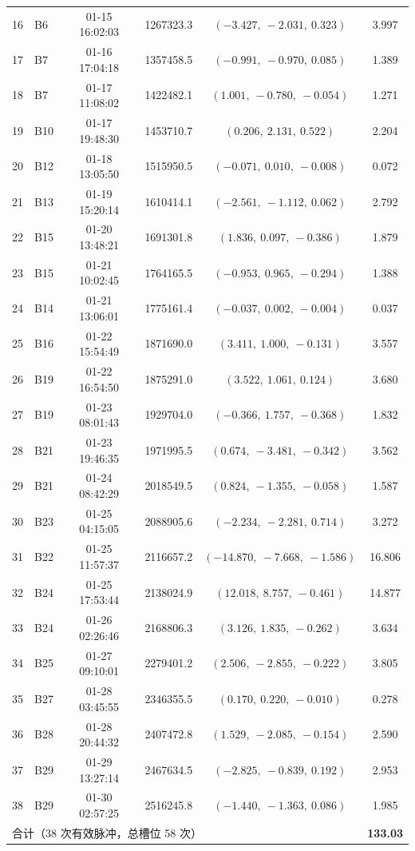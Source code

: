 \begin{table}[!htb]
\begin{tabular}{clcrcc}
    16 & B6 & 01-15 16:02:03 & 1267323.3 & $(-3.427,\ -2.031,\ 0.323)$ & 3.997 \\
    17 & B7 & 01-16 17:04:18 & 1357458.5 & $(-0.991,\ -0.970,\ 0.085)$ & 1.389 \\
    18 & B7 & 01-17 11:08:02 & 1422482.1 & $(1.001,\ -0.780,\ -0.054)$ & 1.271 \\
    19 & B10 & 01-17 19:48:30 & 1453710.7 & $(0.206,\ 2.131,\ 0.522)$ & 2.204 \\
    20 & B12 & 01-18 13:05:50 & 1515950.5 & $(-0.071,\ 0.010,\ -0.008)$ & 0.072 \\
    21 & B13 & 01-19 15:20:14 & 1610414.1 & $(-2.561,\ -1.112,\ 0.062)$ & 2.792 \\
    22 & B15 & 01-20 13:48:21 & 1691301.8 & $(1.836,\ 0.097,\ -0.386)$ & 1.879 \\
    23 & B15 & 01-21 10:02:45 & 1764165.5 & $(-0.953,\ 0.965,\ -0.294)$ & 1.388 \\
    24 & B14 & 01-21 13:06:01 & 1775161.4 & $(-0.037,\ 0.002,\ -0.004)$ & 0.037 \\
    25 & B16 & 01-22 15:54:49 & 1871690.0 & $(3.411,\ 1.000,\ -0.131)$ & 3.557 \\
    26 & B19 & 01-22 16:54:50 & 1875291.0 & $(3.522,\ 1.061,\ 0.124)$ & 3.680 \\
    27 & B19 & 01-23 08:01:43 & 1929704.0 & $(-0.366,\ 1.757,\ -0.368)$ & 1.832 \\
    28 & B21 & 01-23 19:46:35 & 1971995.5 & $(0.674,\ -3.481,\ -0.342)$ & 3.562 \\
    29 & B21 & 01-24 08:42:29 & 2018549.5 & $(0.824,\ -1.355,\ -0.058)$ & 1.587 \\
    30 & B23 & 01-25 04:15:05 & 2088905.6 & $(-2.234,\ -2.281,\ 0.714)$ & 3.272 \\
    31 & B22 & 01-25 11:57:37 & 2116657.2 & $(-14.870,\ -7.668,\ -1.586)$ & 16.806 \\
    32 & B24 & 01-25 17:53:44 & 2138024.9 & $(12.018,\ 8.757,\ -0.461)$ & 14.877 \\
    33 & B24 & 01-26 02:26:46 & 2168806.3 & $(3.126,\ 1.835,\ -0.262)$ & 3.634 \\
    34 & B25 & 01-27 09:10:01 & 2279401.2 & $(2.506,\ -2.855,\ -0.222)$ & 3.805 \\
    35 & B27 & 01-28 03:45:55 & 2346355.5 & $(0.170,\ 0.220,\ -0.010)$ & 0.278 \\
    36 & B28 & 01-28 20:44:32 & 2407472.8 & $(1.529,\ -2.085,\ -0.154)$ & 2.590 \\
    37 & B29 & 01-29 13:27:14 & 2467634.5 & $(-2.825,\ -0.839,\ 0.192)$ & 2.953 \\
    38 & B29 & 01-30 02:57:25 & 2516245.8 & $(-1.440,\ -1.363,\ 0.086)$ & 1.985 \\
    \midrule
    \multicolumn{5}{l}{合计（38 次有效脉冲，总槽位 58 次）} & \textbf{133.03} \\
    \bottomrule
  \end{tabular}
\end{table}

